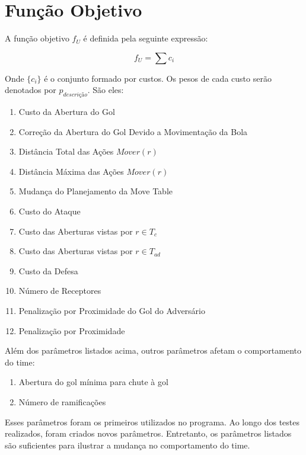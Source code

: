 \section{Função Objetivo}

A função objetivo $f_U$ é definida pela seguinte expressão:

\begin{dmath}
  f_U = \sum c_i 
\end{dmath}

Onde $\lbrace c_i \rbrace$ é o conjunto formado por custos. Os pesos de cada
custo serão denotados por $p_{descrição}$. São eles:
\begin{enumerate}
  \item Custo da Abertura do Gol
  \item Correção da Abertura do Gol Devido a Movimentação da Bola
  \item Distância Total das Ações $Mover(r)$
  \item Distância Máxima das Ações $Mover(r)$
  \item Mudança do Planejamento da Move Table
  \item Custo do Ataque
  \item Custo das Aberturas vistas por $r \in T_c$
  \item Custo das Aberturas vistas por $r \in T_{ad}$
  \item Custo da Defesa
  \item Número de Receptores
  \item Penalização por Proximidade do Gol do Adversário
  \item Penalização por Proximidade
\end{enumerate}

Além dos parâmetros listados acima, outros parâmetros afetam o comportamento do
time:
\begin{enumerate}
  \item Abertura do gol mínima para chute à gol
  \item Número de ramificações
\end{enumerate}

Esses parâmetros foram os primeiros utilizados no programa.  Ao longo dos testes
realizados, foram criados novos parâmetros.  Entretanto, os parâmetros listados
são suficientes para ilustrar a mudança no comportamento do time.

